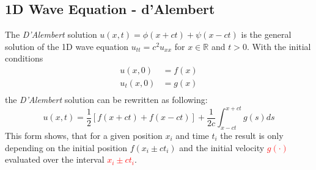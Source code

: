 \subsection{1D Wave Equation - d'Alembert}
The \textit{D'Alembert} solution $u(x,t) = \phi(x+ct)+\psi(x-ct)$ is the general solution of the 1D wave equation $u_{tt}=c^2u_{xx}$ for $x \in \mathbb{R}$ and $t>0$. With the initial conditions
\begin{align*}
    u(x,0)   & = f(x) \\
    u_t(x,0) & = g(x) \\
\end{align*}
the \textit{D'Alembert} solution can be rewritten as following:
\begin{equation*}
    u(x,t)=\frac{1}{2}\left[f(x+ct)+f(x-ct)\right]+\frac{1}{2c}\int_{x-ct}^{x+ct}g(s)ds
\end{equation*}
This form shows, that for a given position $x_i$ and time $t_i$ the result is only depending on the initial position \textcolor{mathGreen}{$f(x_i\pm ct_i)$} and the initial velocity \textcolor{red}{$g(\cdot)$} evaluated over the interval \textcolor{red}{$x_i\pm ct_i$}.
\begin{center}
\end{center}

